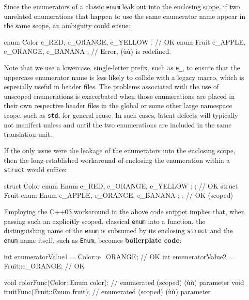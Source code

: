 Since the enumerators of a classic \texttt{enum} leak out into the
enclosing scope, if two unrelated enumerations that happen to use the
same enumerator name appear in the same scope, an ambiguity could ensue:

\begin{emcppslisting}
enum Color { e_RED, e_ORANGE, e_YELLOW };    // OK
enum Fruit { e_APPLE, e_ORANGE, e_BANANA };  // Error, (ù{}ù) is redefined.
\end{emcppslisting}

\noindent Note that
we use a lowercase, single-letter prefix, such as \texttt{e\_}, to
ensure that the uppercase enumerator name is less likely to collide
  with a legacy macro, which is especially useful in header files. The problems associated with the use of unscoped enumerations is
exacerbated when those enumerations are placed in their own respective
header files in the global or some other large namespace scope, such as
\texttt{std}, for general reuse. In such cases, latent defects will
typically not manifest unless and until the two enumerations are
included in the same translation unit.

If the only issue were the leakage of the enumerators into the enclosing
scope, then the long-established workaround of enclosing the enumeration
within a \texttt{struct} would suffice:

\begin{emcppslisting}[emcppsbatch=e1]
struct Color { enum Enum { e_RED, e_ORANGE, e_YELLOW };  };   // OK
struct Fruit { enum Enum { e_APPLE, e_ORANGE, e_BANANA }; };  // OK (scoped)
\end{emcppslisting}

\noindent Employing the C++03 workaround in the above code snippet implies that,
when passing such an explicitly scoped, classical \texttt{enum} into a
function, the distinguishing name of the \texttt{enum} is subsumed by
its enclosing \texttt{struct} and the \texttt{enum} name itself, such as
\texttt{Enum}, becomes \textbf{boilerplate code}:

\begin{emcppslisting}[emcppsbatch=e1]
int enumeratorValue1 = Color::e_ORANGE;  // OK
int enumeratorValue2 = Fruit::e_ORANGE;  // OK

void colorFunc(Color::Enum color);  // enumerated (scoped) (ù{}ù) parameter
void fruitFunc(Fruit::Enum fruit);  // enumerated (scoped) (ù{}ù) parameter
\end{emcppslisting}

